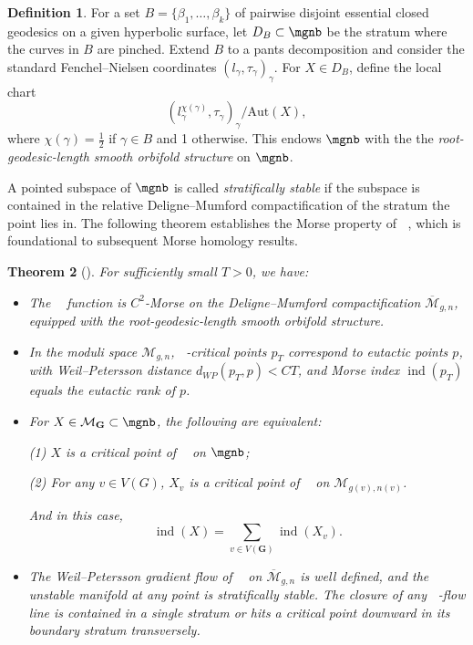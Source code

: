 \documentclass[12pt]{amsart}
\newtheorem{theorem}{Theorem}[section]
\theoremstyle{remark}
\theoremstyle{definition}
\newtheorem{definition}[theorem]{Definition}
\DeclareMathOperator{\ind}{ind}
\DeclareMathOperator{\syst}{sys_T}
\numberwithin{equation}{section}
\begin{document}
\begin{definition}
    For a set $B=\{\beta_1,\dots,\beta_k\}$ of pairwise disjoint essential closed geodesics on a given hyperbolic surface, let $D_B\subset\mgnb$ be the stratum where the curves in $B$ are pinched. Extend $B$ to a pants decomposition and consider the standard Fenchel--Nielsen coordinates $(l_\gamma,\tau_\gamma)_\gamma$. For $X\in D_B$, define the local chart
    \[
    (l_\gamma^{\chi(\gamma)},\tau_\gamma)_\gamma/\text{Aut}(X),
    \]
    where $\chi(\gamma)=\frac{1}{2}$ if $\gamma\in B$ and 1 otherwise. This endows $\mgnb$ with the the \emph{root-geodesic-length smooth orbifold structure} on $\mgnb$.
\end{definition}


A pointed subspace of $\mgnb$ is called \emph{stratifically stable} if the subspace is contained in the relative Deligne--Mumford compactification of the stratum the point lies in. The following theorem establishes the Morse property of $\syst$, which is foundational to subsequent Morse homology results.


\begin{theorem}[\cite{chen2023morse}]
\label{Morse property}
For sufficiently small $T>0$, we have:
\begin{itemize}
    \item The $\syst$ function is $C^2$-Morse on the Deligne--Mumford compactification $\overline{\mathcal M}_{g,n}$, equipped with the root-geodesic-length smooth orbifold structure.

    \item In the moduli space $\mathcal M_{g,n}$, $\syst$-critical points $p_T$ correspond to eutactic points $p$, with Weil--Petersson distance $d_{WP}(p_T,p) < C T$, and Morse index $\ind(p_T)$ equals the eutactic rank of $p$.

    \item For $X\in\mathcal M_{\textbf{G}}\subset\mgnb$, the following are equivalent:

    (1) $X$ is a critical point of $\syst$ on $\mgnb$;
    
    (2) For any $v\in V(G)$, $X_v$ is a critical point of $\syst$ on $\mathcal M_{g(v),n(v)}$.
    
    And in this case,
    \[
    \ind(X)=\sum_{v\in V(\textbf{G})}\ind(X_v).
    \]

    \item The Weil--Petersson gradient flow of $\syst$ on $\overline{\mathcal M}_{g,n}$ is well defined, and the unstable manifold at any point is stratifically stable. The closure of any $\syst$-flow line is contained in a single stratum or hits a critical point downward in its boundary stratum transversely.
\end{itemize}
\end{theorem}
\end{document}

